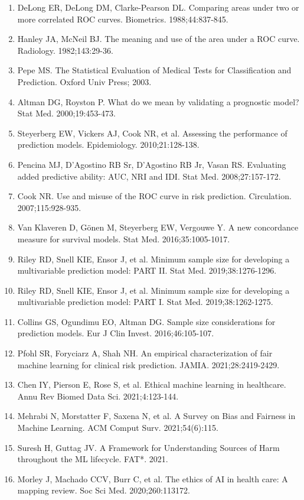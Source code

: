 \documentclass[11pt]{article}
\begin{document}
\begin{enumerate}
\item DeLong ER, DeLong DM, Clarke-Pearson DL. Comparing areas under two or more correlated ROC curves. Biometrics. 1988;44:837-845.
\item Hanley JA, McNeil BJ. The meaning and use of the area under a ROC curve. Radiology. 1982;143:29-36.
\item Pepe MS. The Statistical Evaluation of Medical Tests for Classification and Prediction. Oxford Univ Press; 2003.
\item Altman DG, Royston P. What do we mean by validating a prognostic model? Stat Med. 2000;19:453-473.
\item Steyerberg EW, Vickers AJ, Cook NR, et al. Assessing the performance of prediction models. Epidemiology. 2010;21:128-138.
\item Pencina MJ, D'Agostino RB Sr, D'Agostino RB Jr, Vasan RS. Evaluating added predictive ability: AUC, NRI and IDI. Stat Med. 2008;27:157-172.
\item Cook NR. Use and misuse of the ROC curve in risk prediction. Circulation. 2007;115:928-935.
\item Van Klaveren D, Gönen M, Steyerberg EW, Vergouwe Y. A new concordance measure for survival models. Stat Med. 2016;35:1005-1017.
\item Riley RD, Snell KIE, Ensor J, et al. Minimum sample size for developing a multivariable prediction model: PART II. Stat Med. 2019;38:1276-1296.
\item Riley RD, Snell KIE, Ensor J, et al. Minimum sample size for developing a multivariable prediction model: PART I. Stat Med. 2019;38:1262-1275.
\item Collins GS, Ogundimu EO, Altman DG. Sample size considerations for prediction models. Eur J Clin Invest. 2016;46:105-107.
\item Pfohl SR, Foryciarz A, Shah NH. An empirical characterization of fair machine learning for clinical risk prediction. JAMIA. 2021;28:2419-2429.
\item Chen IY, Pierson E, Rose S, et al. Ethical machine learning in healthcare. Annu Rev Biomed Data Sci. 2021;4:123-144.
\item Mehrabi N, Morstatter F, Saxena N, et al. A Survey on Bias and Fairness in Machine Learning. ACM Comput Surv. 2021;54(6):115.
\item Suresh H, Guttag JV. A Framework for Understanding Sources of Harm throughout the ML lifecycle. FAT*. 2021.
\item Morley J, Machado CCV, Burr C, et al. The ethics of AI in health care: A mapping review. Soc Sci Med. 2020;260:113172.

\end{enumerate}
\end{document}
